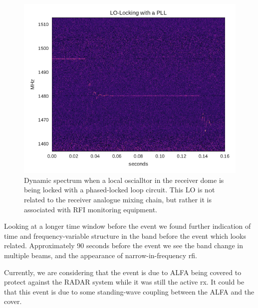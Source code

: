 \documentclass[a4paper,fleqn,usenatbib]{mnras}
\begin{document}
%
\begin{figure}
    \includegraphics[width=1.0\linewidth]{figures/pll_spectrum.pdf}
    \caption{Dynamic spectrum when a local oscialltor in the receiver dome is
    being locked with a phased-locked loop circuit. This LO is not related to
    the receiver analogue mixing chain, but rather it is associated with RFI
    monitoring equipment.
    }
    \label{fig:pll_spectrum}
\end{figure}
%

Looking at a longer time window before the event we found further indication of
time and frequency-variable structure in the band before the event which looks
related. Approximately 90 seconds before the event we see the band change in
multiple beams, and the appearance of narrow-in-frequency \gls{rfi}.


Currently, we are considering that the event is due to ALFA being covered to
protect against the RADAR system while it was still the active rx. It could be
that this event is due to some standing-wave coupling between the ALFA and the
cover.

\end{document}
